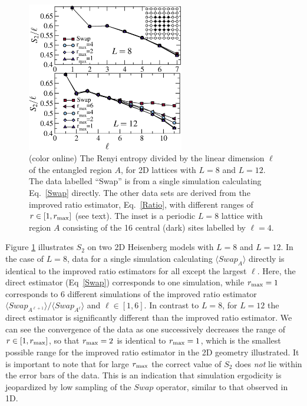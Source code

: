 \documentclass[prl,aps,twocolumn,floatfix,amsmath,amssymb,superscriptaddress,tightenlines]{revtex4}
\begin{document}
\begin{figure} {
\includegraphics[width=2.7in]{L8n12_ratio.eps} \caption{(color online) 
\label{L16fig}
The Renyi entropy divided by the linear dimension $\ell$ of the entangled region $A$, for 2D lattices with $L=8$ and $L=12$.  The data labelled ``Swap'' is from a single simulation calculating Eq.~\eqref{Swap} directly.  The other
data sets are derived from the improved ratio estimator, Eq.~\eqref{Ratio}, with different ranges of $r \in [1,r_{\rm max}]$ (see text).  The inset 
is a periodic $L=8$ lattice with region $A$ consisting of the 16 central (dark) sites labelled by $\ell = 4$.
}
} \end{figure}

Figure \ref{L16fig} illustrates $S_2$ on two 2D Heisenberg models with  $L=8$ and  $L=12$.  In the case of $L=8$, data for a single 
simulation calculating $\langle Swap_A \rangle$ directly is identical to the improved ratio estimators for all except the largest $\ell$.  
Here, the direct estimator (Eq~\eqref{Swap}) corresponds to one simulation, while $r_{\rm max}=1$ corresponds to 6 different simulations of the improved ratio estimator ${\langle Swap_{A^{\ell+1}}\rangle}/{\langle Swap_{A^{\ell}}\rangle}$ and $\ell \in [1,6]$.
In contrast to $L=8$, for $L=12$ the direct estimator is significantly different than 
the improved ratio estimator.  We can see the convergence of the data as one successively decreases the range of $r \in [1,r_{\rm max}]$, 
so that $r_{\rm max}=2$ is identical to $r_{\rm max}=1$, which is the smallest possible range for the improved ratio estimator in the 2D geometry illustrated.  It is important to note that for large $r_{\rm max}$ the correct value of $S_2$ does {\it not} lie within the error bars of the data.  
This is an indication that simulation ergodicity is jeopardized by low sampling of the $Swap$ operator, similar to that observed in 1D.
\end{document}
